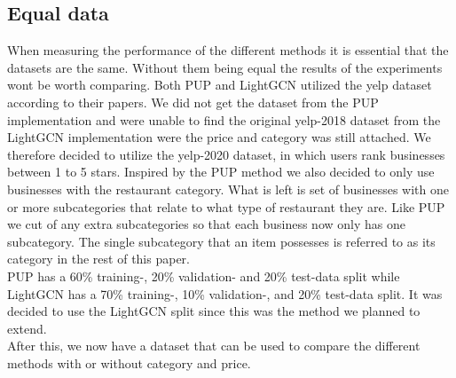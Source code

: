 \subsection{Equal data} \label{equal-data}
When measuring the performance of the different methods it is essential that the datasets are the same.
Without them being equal the results of the experiments wont be worth comparing.
Both PUP and LightGCN utilized the yelp dataset according to their papers.
We did not get the dataset from the PUP implementation and were unable to find the original yelp-2018 dataset from the LightGCN implementation were the price and category was still attached.
We therefore decided to utilize the yelp-2020 dataset, in which users rank businesses between 1 to 5 stars.
Inspired by the PUP method we also decided to only use businesses with the restaurant category.
What is left is set of businesses with one or more subcategories that relate to what type of restaurant they are.
Like PUP we cut of any extra subcategories so that each business now only has one subcategory.
The single subcategory that an item possesses is referred to as its category in the rest of this paper.
\\
PUP has a 60\% training-, 20\% validation- and 20\% test-data split while LightGCN has a 70\% training-, 10\% validation-, and 20\% test-data split.
It was decided to use the LightGCN split since this was the method we planned to extend.
\\
After this, we now have a dataset that can be used to compare the different methods with or without category and price.
